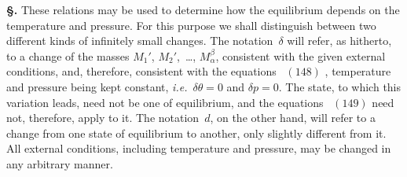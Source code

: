 \documentclass[12pt]{book}[2005/09/16]
\newcommand{\Chg}[2]{#2}
\newcommand{\Add}[1]{\Chg{}{#1}}
\newcommand{\Section}[1]{
  \medskip\par\textbf{§\;#1}
  \label{section:#1}
}
\newcommand{\Eq}[1]{%
  \hyperref[eqn:#1]{\ensuremath{#1}}%
}
\newcommand{\ie}{\emph{i.e.}}
\begin{document}
\Section{211.} These relations may be used to determine how
the equilibrium depends on the temperature and pressure.
For this purpose we shall distinguish between two different
kinds of infinitely small changes. The notation~$\delta$ will
refer, as hitherto, to a change of the masses $M_{1}'$, $M_{2}'$,~\dots\Add{,} $M_{\alpha}^{\beta}$,
consistent with the given external conditions, and, therefore,
consistent with the equations~\Eq{(148)}, temperature and pressure
being kept constant, \ie\ $\delta \theta = 0$ and $\delta p = 0$. The state, to
which this variation leads, need not be one of equilibrium,
and the equations~\Eq{(149)} need not, therefore, apply to it. The
notation~$d$, on the other hand, will refer to a change from
one state of equilibrium to another, only slightly different
from it. All external conditions, including temperature and
pressure, may be changed in any arbitrary manner.
\end{document}
